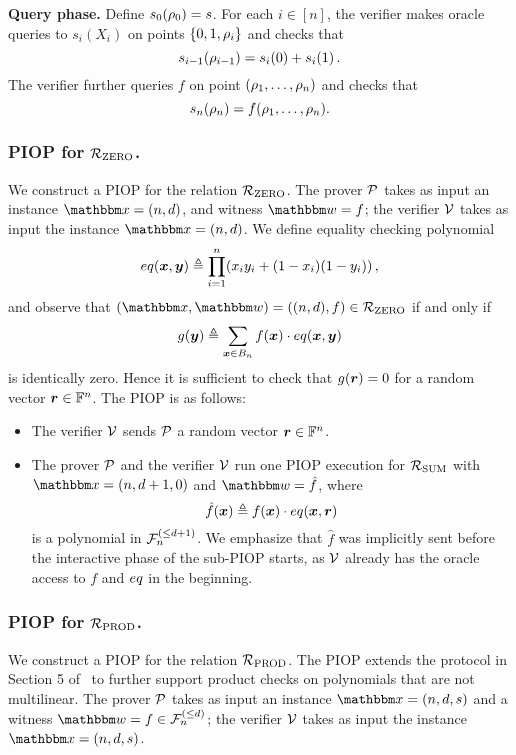 \textbf{Query phase.}
Define $s_0(\rho_{0}) = s$. For each $i \in [n]$, the verifier makes oracle queries to $s_i(X_i)$ on points
$\{0, 1, \rho_{i} \}$ and checks that
\[
  s_{i-1}(\rho_{i-1}) = s_{i}(0) + s_{i}(1) \,.  
\]
The verifier further queries $f$ on point $(\rho_{1}, \dots, \rho_{n})$ and checks that
\[
  s_n(\rho_{n}) = f(\rho_{1}, \dots, \rho_{n}).  
\]

\subsubsection*{PIOP for ${\mathcal{R}}_{\text{ZERO}}$.} 
We construct a PIOP for the relation ${\mathcal{R}}_{\text{ZERO}}$.
The prover $\mathcal{P}$ takes as input an instance $\instR = (n, d)$,
and witness $\witR = f$; the verifier $\mathcal{V}$ takes as input the 
instance $\instR = (n, d)$. We define equality checking polynomial
\[
  eq(\boldsymbol{x}, \boldsymbol{y}) \mathrel{\triangleq} \prod_{i=1}^{n} (x_iy_i + (1-x_i)(1-y_i)) \,,
\]
and observe that $(\instR, \witR) = ((n,d), f) \in \RZERO$ if and only if
\[
  g(\boldsymbol{y}) \mathrel{\triangleq} \sum_{\boldsymbol{x} \in B_{n}} f(\boldsymbol{x}) \cdot eq(\boldsymbol{x}, \boldsymbol{y})  
\]
is identically zero. Hence it is sufficient to check that $g(\boldsymbol{r}) = 0$
for a random vector $\boldsymbol{r} \in \mathbb{F}^n$. The PIOP is as follows:
\begin{itemize}
    \item The verifier $\mathcal{V}$ sends $\mathcal{P}$ a random vector $\boldsymbol{r} \in \mathbb{F}^{n}$.
    \item The prover $\mathcal{P}$ and the verifier $\mathcal{V}$ run one PIOP execution
    for ${\mathcal{R}}_{\text{SUM}}$ with $\instR = (n, d+1, 0)$ and $\witR = \hat{f}$, where
    \[
      \hat{f}(\boldsymbol{x}) \mathrel{\triangleq} f(\boldsymbol{x}) \cdot eq(\boldsymbol{x}, \boldsymbol{r}) 
    \]
    is a polynomial in ${\mathcal{F}}_{n}^{(\le{d+1})}$.
    We emphasize that $\hat{f}$ was implicitly sent before the interactive phase of the sub-PIOP starts,
    as $\mathcal{V}$ already has the oracle access to $f$ and $eq$ in the beginning.
\end{itemize}

\subsubsection*{PIOP for ${\mathcal{R}}_{\text{PROD}}$.}
We construct a PIOP for the relation ${\mathcal{R}}_{\text{PROD}}$.
The PIOP extends the protocol in Section 5
of~\cite{SL20} to further support product checks on polynomials that are not multilinear.
The prover $\mathcal{P}$ takes as input an instance $\instR = (n, d, s)$
and a witness $\witR = f \in \bdp{n}{d}$; the verifier $\mathcal{V}$
takes as input the instance $\instR = (n, d, s)$.

